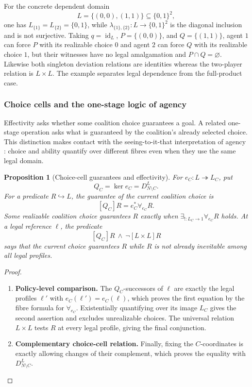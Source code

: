 \documentclass[11pt,a4paper]{article}
\numberwithin{equation}{section}
\newtheorem{proposition}[theorem]{Proposition}
\theoremstyle{definition}
\theoremstyle{remark}
\theoremstyle{plain}
\begin{document}
For the concrete dependent domain
\[
 L=\{(0,0),(1,1)\}\subseteq\{0,1\}^2,
\]
one has $L_{\{1\}}=L_{\{2\}}=\{0,1\}$, while
$\lambda_{\{1\},\{2\}}:L\to\{0,1\}^2$ is the diagonal inclusion and is
not surjective. Taking $q=\operatorname{id}_L$,
$P=\{(0,0)\}$, and $Q=\{(1,1)\}$, agent $1$ can force $P$ with its
realizable choice $0$ and agent $2$ can force $Q$ with its realizable choice
$1$, but their witnesses have no legal amalgamation and
$P\cap Q=\varnothing$. Likewise both singleton deviation relations are
identities whereas the two-player relation is $L\times L$.
The example separates legal dependence from the full-product case.

\subsubsection{Choice cells and the one-stage logic of agency}
\label{sec:egt-choice-cell-logic}

Effectivity asks whether some coalition choice guarantees a goal.
A related one-stage operation asks what is guaranteed by the coalition's
already selected choice. This distinction makes contact with the
seeing-to-it-that interpretation of agency
\citep{HortyBelnap1995DeliberativeStit}: choice and ability quantify
over different fibres even when they use the same legal domain.

\begin{proposition}[Choice-cell guarantees and effectivity]
\label{prop:egt-choice-cell-comparison}
For $e_C:L\twoheadrightarrow L_C$, put
\[
 Q_C=\ker e_C=D_{N\setminus C}^L.
\]
For a predicate $R\hookrightarrow L$, the guarantee of the current
coalition choice is
\[
 [Q_C]R=e_C^*\forall_{e_C}R.
\]
Some realizable coalition choice guarantees $R$ exactly when
$\exists_{!:L_C\to1}\forall_{e_C}R$ holds. At a legal reference
$\ell$, the predicate
\[
 [Q_C]R\ \wedge\ \neg[L\times L]R
\]
says that the current choice guarantees $R$ while $R$ is not
already inevitable among all legal profiles.
\end{proposition}
\begin{proof}
\leavevmode
\begin{enumerate}[label=\textup{(\arabic*)},leftmargin=*,itemsep=4pt,topsep=3pt]
  \item \textbf{Policy-level comparison.} The $Q_C$-successors of $\ell$ are exactly the legal profiles
$\ell'$ with $e_C(\ell')=e_C(\ell)$, which proves the first
equation by the fibre formula for $\forall_{e_C}$. Existentially quantifying over its image $L_C$ gives the
second assertion and excludes unrealizable choices. The universal relation $L\times L$ tests $R$ at every legal
profile, giving the final conjunction.
  \item \textbf{Complementary choice-cell relation.} Finally, fixing the
$C$-coordinates is exactly allowing changes of their complement,
which proves the equality with $D_{N\setminus C}^L$.
\end{enumerate}
\end{proof}
\end{document}
